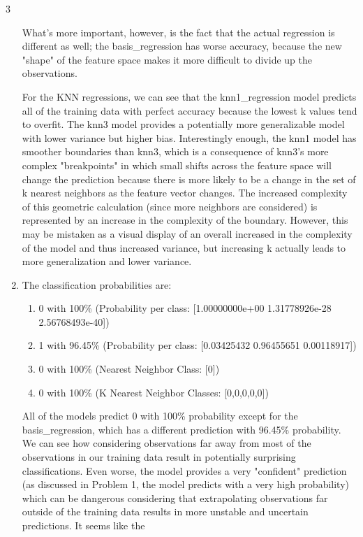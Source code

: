 \documentclass[submit]{harvardml}
\begin{document}
\begin{sol}{}{3}
\begin{enumerate}
    What's more important, however, is the fact that the actual regression is different as well; 
    the basis\_regression has worse accuracy, because the new "shape" of the feature space
    makes it more difficult to divide up the observations.

    For the KNN regressions, we can see that the knn1\_regression model predicts
    all of the training data with perfect accuracy because the lowest k values
    tend to overfit. The knn3 model provides a potentially more generalizable
    model with lower variance but higher bias. Interestingly enough, the knn1
    model has smoother boundaries than knn3, which is a consequence of knn3's more complex
    "breakpoints" in which small shifts across the feature space will change
    the prediction because there is more likely to be a change in the set of k nearest neighbors
    as the feature vector changes.
    The increased complexity of this geometric calculation
    (since more neighbors are considered) is represented by an increase in the
    complexity of the boundary.
    However, this may be mistaken as a visual display of an overall increased in the complexity 
    of the model and thus increased variance, but increasing k actually leads to more generalization 
    and lower variance.
    \item The classification probabilities are:
    \begin{enumerate}
      \item 0 with 100\% (Probability per class: [1.00000000e+00 1.31778926e-28 2.56768493e-40])
      \item 1 with 96.45\% (Probability per class: [0.03425432 0.96455651 0.00118917])
      \item 0 with 100\% (Nearest Neighbor Class: [0])
      \item 0 with 100\% (K Nearest Neighbor Classes: [0,0,0,0,0])
    \end{enumerate}
    All of the models predict 0 with 100\% probability except for the basis\_regression,
    which has a different prediction with 96.45\% probability. We can see how considering
    observations far away from most of the observations in our training data result
    in potentially surprising classifications. Even worse, the model provides a very
    "confident" prediction (as discussed in Problem 1, the model predicts with a very high probability)
    which can be dangerous considering that extrapolating observations far outside of the training
    data results in more unstable and uncertain predictions. It seems like the

\end{enumerate}
\end{sol}
\end{document}
